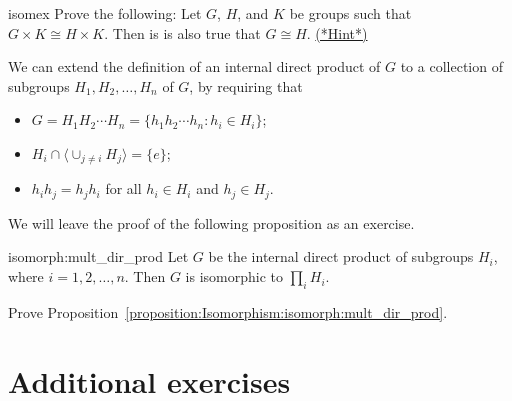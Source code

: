 \begin{exercise}{isomex}
Prove the following: Let $G$, $H$, and $K$ be
groups such that $G \times K \cong H \times K$. Then is is also true that $G \cong H$. 
\hyperref[sec:Isomorphism:hints]{(*Hint*)}
\end{exercise}

We can extend the definition of an internal direct product of $G$ to a
collection of subgroups $H_1, H_2, \ldots, H_n$ of $G$, by requiring
that 
\begin{itemize}
 
\item
$G = H_1 H_2 \cdots H_n = \{ h_1 h_2 \cdots h_n : h_i \in H_i \}$;
 
\item
$H_i \cap \langle \cup_{j \neq i} H_j \rangle = \{ e \}$;
 
\item
$h_i h_j = h_j h_i$ for all $h_i \in H_i$ and $h_j \in H_j$.
 
\end{itemize}
We will leave the proof of the following proposition as an exercise. 
 
\begin{prop}{isomorph:mult_dir_prod}
Let $G$ be the internal direct product of subgroups $H_i$, where $i =
1, 2, \ldots, n$. Then $G$ is isomorphic to $\prod_i H_i$. 
\end{prop}

\begin{exercise}{}
Prove Proposition~\ref{proposition:Isomorphism:isomorph:mult_dir_prod}.
\end{exercise}
 


 
\section*{Additional exercises}
\label{sec:Isomorphism:AdditionalExercises}
\exrule

 
 
